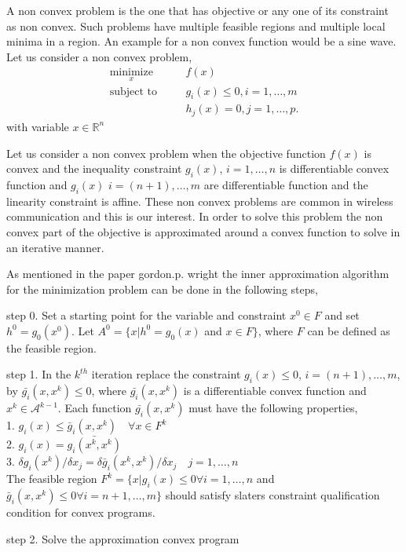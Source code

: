\documentclass[a4paper, 12pt,titlepage]{dithesis} %
\newcommand{\me}[1]{\( #1 \)}
\begin{document}
A non convex problem is the one that has objective or any one of its constraint as non convex. Such problems have multiple feasible regions and multiple local minima in a region. An example for a non convex function would be a sine wave. Let us consider a non convex problem,
\begin{eqnarray}
\underset{x}{\text{minimize}} \quad && f(x) \\
\text{subject to} \quad && g_i(x) \leq 0, i = 1,\dotsc,m\\
&& h_j(x) = 0, j = 1,\dotsc,p.
\end{eqnarray} 
with variable \me{x \in \mathbb{R}^n}
\par
Let us consider a non convex problem when the objective function \me{f(x)} is convex and the inequality constraint \me{g_i(x)}, \me{i=1,\dotsc,n}  is differentiable convex function and \me{g_i(x)}  \me{i= (n+1),\dotsc,m} are differentiable function and the linearity constraint is affine. These non convex problems are common in wireless communication and this is our interest. In order to solve this problem the non convex part of the objective is approximated around a convex function to solve in an iterative manner. 
\par
As mentioned in the paper gordon.p. wright the inner approximation algorithm for the minimization problem can be done in the following steps,\\
\par
step 0. Set a starting point for the variable and constraint \me{x^0 \in F} and set \me{h^0 = g_0(x^0)}. Let \me{A^0 = \lbrace x|h^0 = g_0(x)} and \me{x \in F \rbrace}, where \me{F} can be defined as the feasible region.\\
\par
step 1. In the \me{k^{th}} iteration replace the constraint \me{g_i(x) \leq 0}, \me{i = (n+1), \dotsc, m}, by \me{\bar{g_i}(x,x^k) \leq 0}, where \me{\bar{g_i}(x,x^k)} is a differentiable convex function and \me{x^k \in \mathcal{A}^{k - 1}}. Each function \me{\bar{g_i}(x,x^k)} must  have the following properties,\\
1. \me{g_i(x) \leq \bar{g}_i(x,x^k) \quad \forall x \in {F}^k}\\
2. \me{g_i(x) = \bar{g_i(x^k,x^k)}}\\
3. \me{\delta g_i(x^k)/ \delta x_j =\delta \bar{g}_i(x^k,x^k)/\delta x_j \quad j=1,\dotsc,n}\\
The feasible region \me{F^k = \lbrace x|g_i(x) \leq 0 \forall i= 1,\dotsc , n} and \me{\bar{g}_i(x,x^k) \leq 0 \forall i= n+1, \dotsc, m \rbrace} should satisfy slaters constraint qualification condition for convex programs.\\
\par
step 2. Solve the approximation convex program\\
\end{document}
